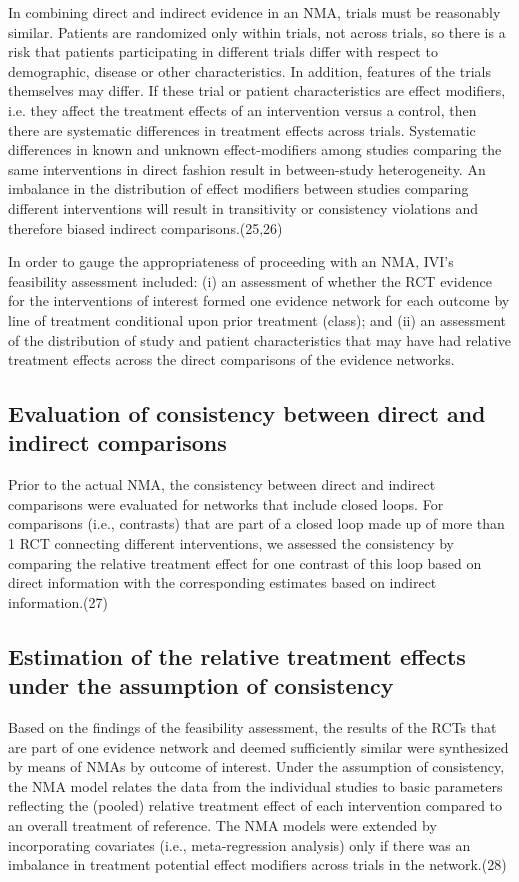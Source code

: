 \documentclass[11pt,final,fleqn]{article}\usepackage[]{graphicx}\usepackage[]{color}
\theoremstyle{plain}
\begin{document}
{\begin{appendices}
In combining direct and indirect evidence in an NMA, trials must be reasonably similar. Patients are randomized only within trials, not across trials, so there is a risk that patients participating in different trials differ with respect to demographic, disease or other characteristics. In addition, features of the trials themselves may differ. If these trial or patient characteristics are effect modifiers, i.e. they affect the treatment effects of an intervention versus a control, then there are systematic differences in treatment effects across trials. Systematic differences in known and unknown effect-modifiers among studies comparing the same interventions in direct fashion result in between-study heterogeneity. An imbalance in the distribution of effect modifiers between studies comparing different interventions will result in transitivity or consistency violations and therefore biased indirect comparisons.(25,26) 

In order to gauge the appropriateness of proceeding with an NMA, IVI's feasibility assessment included: (i) an assessment of whether the RCT evidence for the interventions of interest formed one evidence network for each outcome by line of treatment conditional upon prior treatment (class); and (ii) an assessment of the distribution of study and patient characteristics that may have had relative treatment effects across the direct comparisons of the evidence networks.

\subsection{Evaluation of consistency between direct and indirect comparisons}

Prior to the actual NMA, the consistency between direct and indirect comparisons were evaluated for networks that include closed loops. For comparisons (i.e., contrasts) that are part of a closed loop made up of more than 1 RCT connecting different interventions, we assessed the consistency by comparing the relative treatment effect for one contrast of this loop based on direct information with the corresponding estimates based on indirect information.(27)  

\subsection{Estimation of the relative treatment effects under the assumption of consistency}

Based on the findings of the feasibility assessment, the results of the RCTs that are part of one evidence network and deemed sufficiently similar were synthesized by means of NMAs by outcome of interest. Under the assumption of consistency, the NMA model relates the data from the individual studies to basic parameters reflecting the (pooled) relative treatment effect of each intervention compared to an overall treatment of reference. The NMA models were extended by incorporating covariates (i.e., meta-regression analysis) only if there was an imbalance in treatment potential effect modifiers across trials in the network.(28)


\end{appendices}}
\end{document}
